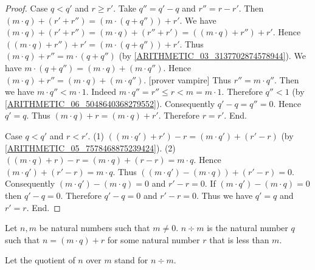 \documentclass[../arithmetic.tex]{subfiles}
\begin{document}
\begin{forthel}
\begin{proof}
      Case $q \less q'$ and $r \geq r'$.
        Take $q'' = q' \minus q$ and $r'' = r \minus r'$.
        Then $(m \cdot q) \plus (r' \plus r'') = (m \cdot (q \plus q'')) \plus r'$.
        We have $(m \cdot q) \plus (r' \plus r'')
          = (m \cdot q) \plus (r'' \plus r')
          = ((m \cdot q) \plus r'') \plus r'$.
        Hence $((m \cdot q) \plus r'') \plus r' = (m \cdot (q \plus q'')) \plus r'$.
        Thus $(m \cdot q) \plus r'' = m \cdot (q \plus q'')$
        (by \cref{ARITHMETIC_03_3137702874578944}).
        We have $m \cdot (q \plus q'') = (m \cdot q) \plus (m \cdot q'')$.
        Hence $(m \cdot q) \plus r'' = (m \cdot q) \plus (m \cdot q'')$.
        [prover vampire]
        Thus $r'' = m \cdot q''$.
        Then we have $m \cdot q'' \less m \cdot 1$.
        Indeed $m \cdot q''
          = r''
          \leq r
          \less m
          = m \cdot 1$.
        Therefore $q'' \less 1$ (by \cref{ARITHMETIC_06_5048640368279552}).
        Consequently $q' \minus q = q'' = 0$.
        Hence $q' = q$.
        Thus $(m \cdot q) \plus r = (m \cdot q) \plus r'$.
        Therefore $r = r'$.
      End.

      Case $q \less q'$ and $r \less r'$.
        (1) $((m \cdot q') \plus r') \minus r = (m \cdot q') \plus (r' \minus r)$
        (by \cref{ARITHMETIC_05_7578468875239424}).
        (2) $((m \cdot q) \plus r) \minus r
          = (m \cdot q) \plus (r \minus r)
          = m \cdot q$.
        Hence $(m \cdot q') \plus (r' \minus r) = m \cdot q$.
        Thus $((m \cdot q') \minus (m \cdot q)) \plus (r' \minus r) = 0$.
        Consequently $(m \cdot q') \minus (m \cdot q) = 0$ and $r' \minus r = 0$.
        If $(m \cdot q') \minus (m \cdot q) = 0$ then $q' \minus q = 0$.
        Therefore $q' \minus q = 0$ and $r' \minus r = 0$.
        Thus we have $q' = q$ and $r' = r$.
      End.
    \end{proof}
  \end{forthel}

  \begin{forthel}
    \begin{definition}
      Let $n, m$ be natural numbers such that $m \neq 0$.
      $n \div m$ is the natural number $q$ such that $n = (m \cdot q) \plus r$ for
      some natural number $r$ that is less than $m$.
    \end{definition}

    Let the quotient of $n$ over $m$ stand for $n \div m$.
  \end{forthel}
\end{document}
